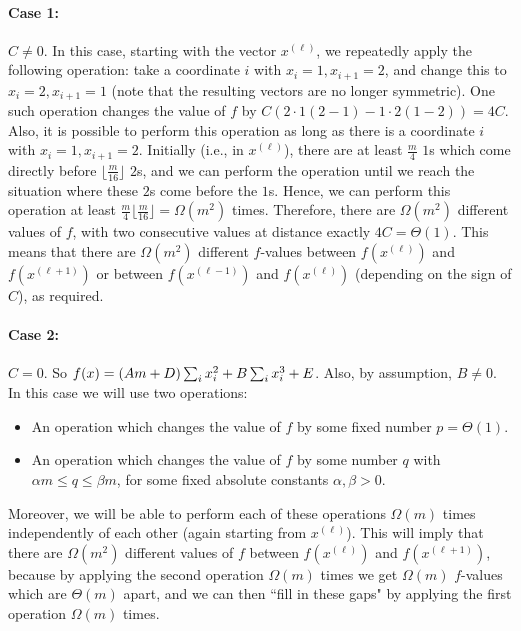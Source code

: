 \documentclass[11pt]{article}
\let\oldendproof\endproof
\renewenvironment{proof}[1][\proofname]{%
	\oldproof[\bf #1]%
}{\oldendproof}
\theoremstyle{plain}
\begin{document}
\begin{proof}[Proof of Lemma \ref{general-values-lemma}]
    \paragraph{Case 1:} $C \neq 0$.  
    In this case, starting with the vector $x^{(\ell)}$, we repeatedly apply the following operation: take a coordinate $i$ with $x_i = 1, x_{i+1} = 2$, and change this to $x_i = 2, x_{i+1} = 1$ (note that the resulting vectors are no longer symmetric). 
    One such operation changes the value of $f$ by 
    $C(2 \cdot 1(2-1) - 1 \cdot 2(1-2)) = 4C$. 
    Also, it is possible to perform this operation as long as there is a coordinate $i$ with $x_i = 1, x_{i+1} = 2$. Initially (i.e., in $x^{(\ell)}$), there are at least $\frac{m}{4}$ $1$s which come directly before $\lfloor \frac{m}{16} \rfloor$ $2$s, and we can perform the operation until we reach the situation where these $2$s come before the $1$s. Hence, we can perform this operation at least 
    $\frac{m}{4} \lfloor \frac{m}{16} \rfloor = \Omega(m^2)$ times. Therefore, there are $\Omega(m^2)$ different values of $f$, with two consecutive values at distance exactly $4C = \Theta(1)$. This means that there are $\Omega(m^2)$ different $f$-values between $f(x^{(\ell)})$ and $f(x^{(\ell+1)})$ or between 
    $f(x^{(\ell-1)})$ and $f(x^{(\ell)})$ (depending on the sign of $C$), as required. 
    
    \paragraph{Case 2:} $C = 0$. 
    So $f(x) = (Am+ \nolinebreak D) \sum_{i} x_i^2 + 
	B \sum_{i} x_i^3 + E$.
    Also, by assumption, $B \neq 0$. 
    In this case we will use two operations:
    \begin{itemize}
        \item An operation which changes the value of $f$ by some fixed number $p = \Theta(1)$.
        \item An operation which changes the value of $f$ by some number $q$ with $\alpha m \leq q \leq \beta m$, for some fixed absolute constants $\alpha,\beta > 0$.
    \end{itemize}
    Moreover, we will be able to perform each of these operations $\Omega(m)$ times independently of each other (again starting from $x^{(\ell)}$). 
    This will imply that there are $\Omega(m^2)$ different values of $f$ between $f(x^{(\ell)})$ and $f(x^{(\ell+1)})$, 
    because by applying the second operation $\Omega(m)$ times we get $\Omega(m)$ $f$-values which are $\Theta(m)$ apart, and we can then ``fill in these gaps" by applying the first operation $\Omega(m)$ times.
    

\end{proof}
\end{document}
